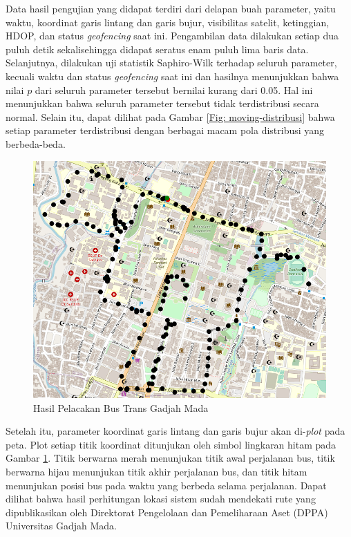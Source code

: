 Data hasil pengujian yang didapat terdiri dari delapan buah parameter, yaitu waktu, koordinat garis lintang dan garis bujur, visibilitas satelit, ketinggian, HDOP, dan status \textit{geofencing} saat ini. Pengambilan data dilakukan setiap dua puluh detik sekalisehingga didapat seratus enam puluh lima baris data. Selanjutnya, dilakukan uji statistik Saphiro-Wilk terhadap seluruh parameter, kecuali waktu dan status \textit{geofencing} saat ini dan hasilnya menunjukkan bahwa nilai $p$ dari seluruh parameter tersebut bernilai kurang dari 0.05. Hal ini menunjukkan bahwa seluruh parameter tersebut tidak terdistribusi secara normal. Selain itu, dapat dilihat pada Gambar \ref{Fig: moving-distribusi} bahwa setiap parameter terdistribusi dengan berbagai macam pola distribusi yang berbeda-beda.

\begin{figure}[H]
	\centering
	\includegraphics[width=12cm]{contents/chapter-4/pengujian-bergerak/tracked-route.png}
	\caption{Hasil Pelacakan Bus Trans Gadjah Mada}
	\label{Fig: moving-tracked-route}
\end{figure}

Setelah itu, parameter koordinat garis lintang dan garis bujur akan di-\textit{plot} pada peta. Plot setiap titik koordinat ditunjukan oleh simbol lingkaran hitam pada Gambar \ref{Fig: moving-tracked-route}. Titik berwarna merah menunjukan titik awal perjalanan bus, titik berwarna hijau menunjukan titik akhir perjalanan bus, dan titik hitam menunjukan posisi bus pada waktu yang berbeda selama perjalanan. Dapat dilihat bahwa hasil perhitungan lokasi sistem sudah mendekati rute yang dipublikasikan oleh Direktorat Pengelolaan dan Pemeliharaan Aset (DPPA) Universitas Gadjah Mada.

